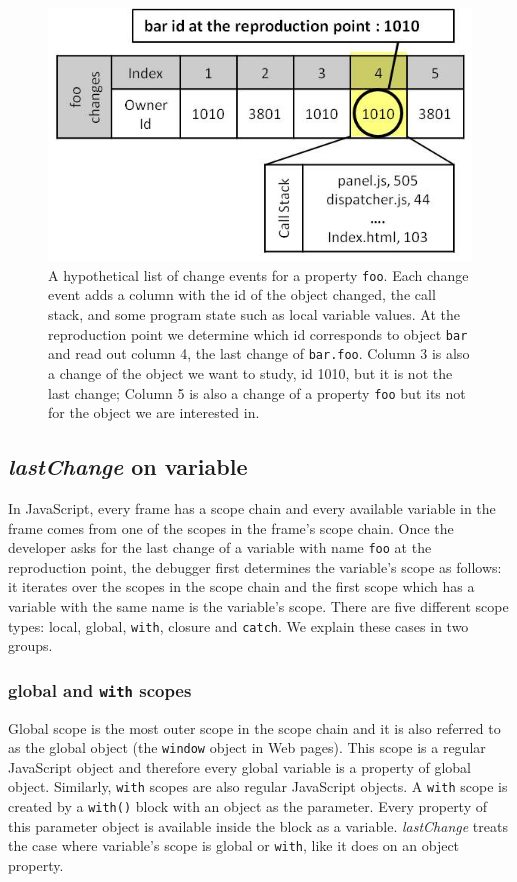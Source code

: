 \documentclass[runningheads,a4paper]{llncs}
\begin{document}
\begin{figure}[htp]
\centering 
\includegraphics[height=.23\textheight]{6-foo-changes1.jpg} 
\caption{A hypothetical list of  change events for a property \texttt{foo}. 
Each change event adds a column with the id of the object changed, the call stack,
and some program state such as local variable values. 
At the reproduction point  we determine which id  corresponds to 
object \texttt{bar} and read out column 4,  the last
  change of \texttt{bar.foo}. Column 3 is also a change of
  the object we want to study, id 1010, but it is not the last change;
  Column 5 is also a change of a property \texttt{foo} but its not for
  the object we are interested in.}
\label{fig:foo-changes1}
\end{figure}

\subsection{\textit{lastChange} on variable} 
In JavaScript, every frame has a scope chain and every available
variable in the frame comes from one of the scopes in the frame's
scope chain. Once the developer asks for the last change of a variable with name 
\texttt{foo} at the reproduction point, the debugger first determines the
variable's scope as follows: it iterates over the scopes in the scope
chain and the first scope which has a variable with the same name is
the variable's scope. There are five different scope types: local,
global, \texttt{with}, closure and \texttt{catch}. We explain these
cases in two groups.

\subsubsection{global and \texttt{with} scopes}
Global scope is the most outer scope in the scope chain and it is
also referred to as the global object (the \texttt{window}
object in Web pages). This scope is a regular JavaScript object and therefore every
global variable is a property of global object. Similarly,
 \texttt{with} scopes are also regular JavaScript objects. A \texttt{with}
scope is created by a \texttt{with()} block with an object as the
parameter. Every property of this parameter object is available inside the
block as a variable. \textit{lastChange} treats the case where variable's scope
is global or \texttt{with}, like it does on an object
property.
\end{document}
